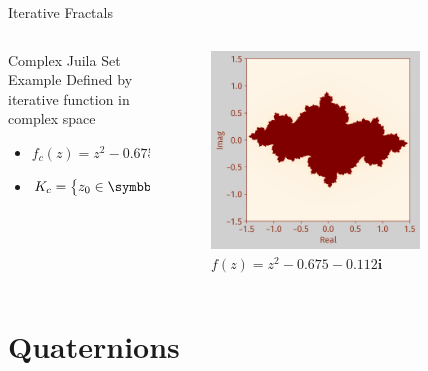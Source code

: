\documentclass[aspectratio=169,t]{beamer}
\DeclarePairedDelimiter\abs{\lvert}{\rvert} %
\begin{document}
\begin{frame}[label={sec:org4bfb106}]{Iterative Fractals}
\begin{columns}
\begin{column}{0.55\columnwidth}
\begin{block}{Complex Juila Set Example}
Defined by iterative function in complex space

\begin{itemize}
\item \(f_c (z) = z^2 - 0.675 - 0.112\symbf{i}\)

\item \(K_c = \left\{ z_0 \in \symbb{C}: \abs{f^k_c \left(z_0 \right)} > B \text{ as } k \to \infty\right\}\)
\end{itemize}
\end{block}
\end{column}

\begin{column}{0.45\columnwidth}
\begin{figure}[htbp]
\centering
\includegraphics[width=0.80\textwidth]{./Figs/Fig_2v2.png}
\caption{\(f(z) = z^2 -0.675 - 0.112\symbf{i}\)}
\end{figure}
\end{column}
\end{columns}
\end{frame}

\section{Quaternions}
\label{sec:orgbfd7548}
\end{document}

